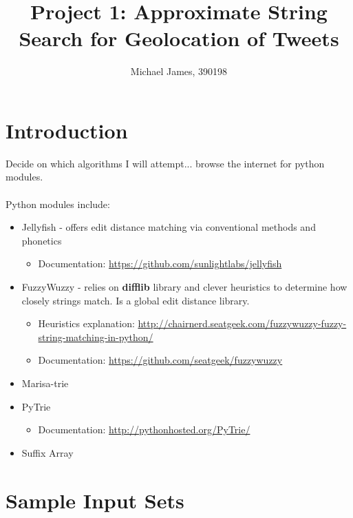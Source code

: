\documentclass[11pt,a4paper]{article}
\author{Michael James, 390198}
\begin{document}
\title{Project 1: Approximate String Search for Geolocation of Tweets}
\maketitle

\section{Introduction}

Decide on which algorithms I will attempt... browse the internet for python modules.\\\\
Python modules include:

\begin{itemize}
	\item Jellyfish - offers edit distance matching via conventional methods and phonetics
	\begin{itemize}
		\item Documentation: \url{https://github.com/sunlightlabs/jellyfish}
	\end{itemize}		
	
	\item FuzzyWuzzy - relies on  \textbf{difflib} library and clever heuristics to determine how closely strings match. Is a global edit distance library.
	\begin{itemize}
		\item Heuristics explanation: \url{http://chairnerd.seatgeek.com/fuzzywuzzy-fuzzy-string-matching-in-python/}
		\item Documentation: \url{https://github.com/seatgeek/fuzzywuzzy}
	\end{itemize}
		
	\item Marisa-trie
	
	\item PyTrie
	\begin{itemize}
		\item Documentation: \url{http://pythonhosted.org/PyTrie/}
	\end{itemize}
	
	\item Suffix Array

\end{itemize}


\section{Sample Input Sets}
\end{document}
